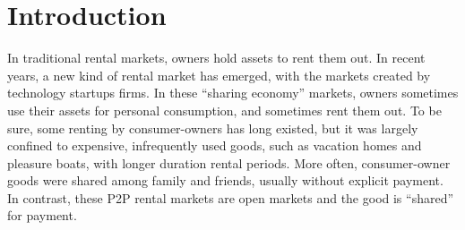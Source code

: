 \documentclass[11pt]{article}
\begin{document}
\onehalfspacing



\section{Introduction}
In traditional rental markets, owners hold assets to rent them out.
In recent years, a new kind of rental market has emerged, with the markets created by technology startups firms.
In these ``sharing economy'' markets, owners sometimes use their assets for personal consumption, and sometimes rent them out.
To be sure, some renting by consumer-owners has long existed, but it was largely confined to expensive, infrequently used goods, such as vacation homes and pleasure boats, with longer duration rental periods.
More often, consumer-owner goods were shared among family and friends, usually without explicit payment.
In contrast, these P2P rental markets are open markets and the good is ``shared'' for payment. 
\end{document}
